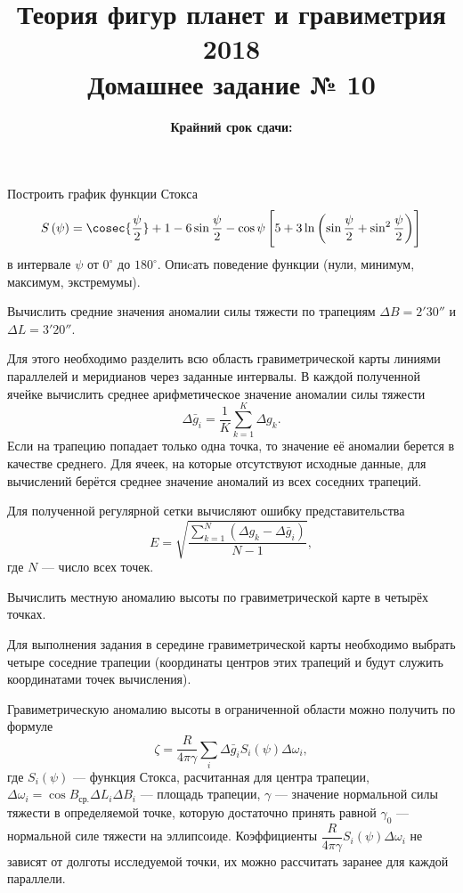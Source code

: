 \documentclass[11pt, a4paper,addpoints]{exam}
\title{{\Large Теория фигур планет и гравиметрия 2018}\\ 
    {\bf\Large Домашнее задание № 10}}
\author{}
\date{\normalsize\bf Крайний срок сдачи: \DTMusedate{deadline}}
\theoremstyle{remark}
\begin{document}
\maketitle
\begin{questions}
    \question Построить график функции Стокса 
    \begin{equation*}
        S \left( \psi \right) = \cosec{\dfrac{\psi}{2}} + 1 - 6\sin{\dfrac{\psi}{2}} - 
        \cos{\psi}\left[ 5 + 3\ln\left( \sin{\dfrac{\psi}{2}} + \sin^2{\dfrac{\psi}{2}} \right) \right]
    \end{equation*}
    в интервале $\psi$ от
    $0^\circ$ до $180^\circ$. Опиcать поведение функции (нули, минимум, максимум, экстремумы).

    \question Вычислить средние значения аномалии силы тяжести по трапециям $\Delta B = 2'30''$ и
    $\Delta L = 3'20''$.

    Для этого необходимо разделить всю область гравиметрической карты линиями параллелей и меридианов через
    заданные интервалы. В каждой полученной ячейке вычислить среднее арифметическое значение аномалии силы 
    тяжести 
    \begin{equation*}
        \Delta \bar{g}_i = \dfrac{1}{K} \sum\limits_{k=1}^K \Delta g_k.
    \end{equation*}
    Если на трапецию попадает только одна точка, то значение её аномалии берется в качестве среднего. 
    Для ячеек, на которые отсутствуют исходные данные, для вычислений берётся среднее
    значение аномалий из всех соседних трапеций. 

    Для полученной регулярной сетки вычисляют ошибку представительства
    \begin{equation*}
        E = \sqrt{\dfrac{\sum\limits_{k=1}^N \left( \Delta g_k - \Delta\bar{g}_i \right)}{N - 1}},
    \end{equation*}
    где $N$ --- число всех точек.

    \question Вычислить местную аномалию высоты по гравиметрической карте в четырёх точках.

    Для выполнения задания в середине гравиметрической карты необходимо выбрать четыре соседние
    трапеции (координаты центров этих трапеций и будут служить координатами точек вычисления).

    Гравиметрическую аномалию высоты в ограниченной области можно получить по формуле
    \begin{equation*}
        \zeta = \dfrac{R}{4\pi\gamma} \sum\limits_{i} \Delta \bar{g}_i S_i\left( \psi \right)
        \Delta\omega_i,
    \end{equation*}
    где $S_i\left( \psi \right)$ --- функция Стокса, расчитанная для центра трапеции,
    $\Delta\omega_i = \cos{B_{\textrm{ср.}}}\Delta L_i \Delta B_i$ --- площадь трапеции, $\gamma$
    --- значение нормальной силы тяжести в определяемой точке, которую достаточно принять равной
    $\gamma_0$ --- нормальной силе тяжести на эллипсоиде.
    Коэффициенты $\dfrac{R}{4\pi\gamma} S_i\left(\psi \right)\Delta\omega_i$ не зависят от
    долготы исследуемой точки, их можно рассчитать заранее для каждой параллели.


\end{questions}
\end{document}
